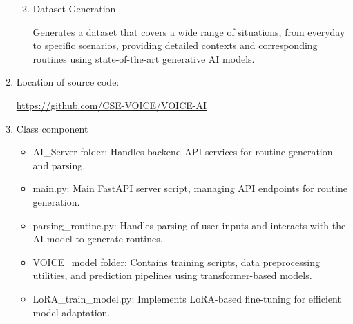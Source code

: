 \documentclass[conference]{IEEEtran}
\begin{document}
\begin{enumerate}[label=\arabic*]
\begin{enumerate}[label=\arabic*)]
        \vspace{1em}

        \item Dataset Generation\par
        \vspace{0.3em}
        Generates a dataset that covers a wide range of situations, from everyday to specific scenarios, providing detailed contexts and corresponding routines using state-of-the-art generative AI models.
    \end{enumerate}

    \vspace{1em}

    \item Location of source code:\par
    \vspace{0.3em}
    \href{https://github.com/CSE-VOICE/VOICE-AI}{https://github.com/CSE-VOICE/VOICE-AI}

    \vspace{1em}

    \item Class component\par
    \vspace{0.3em}

    \begin{itemize}[label=-]
        \item AI\_Server folder: Handles backend API services for routine generation and parsing.
        \vspace{0.7em}

        \item main.py: Main FastAPI server script, managing API endpoints for routine generation.
        \vspace{0.7em}

        \item parsing\_routine.py: Handles parsing of user inputs and interacts with the AI model to generate routines.
        \vspace{0.7em}

        \item VOICE\_model folder: Contains training scripts, data preprocessing utilities, and prediction pipelines using transformer-based models.
        \vspace{0.7em}

        \item LoRA\_train\_model.py: Implements LoRA-based fine-tuning for efficient model adaptation.
        \vspace{0.7em}


\end{itemize}
\end{enumerate}
\end{document}
